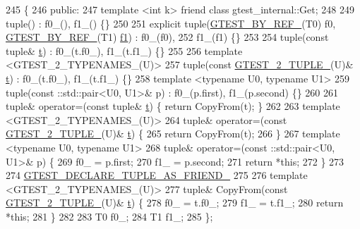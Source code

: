 \begin{DoxyCode}
245                         \{
246  \textcolor{keyword}{public}:
247   \textcolor{keyword}{template} <\textcolor{keywordtype}{int} k> \textcolor{keyword}{friend} \textcolor{keyword}{class }gtest\_internal::Get;
248 
249   tuple() : f0\_(), f1\_() \{\}
250 
251   \textcolor{keyword}{explicit} tuple(\hyperlink{gtest-tuple_8h_adcf9057737a411d833fac0382c13a181}{GTEST\_BY\_REF\_}(T0) f0, \hyperlink{gtest-tuple_8h_adcf9057737a411d833fac0382c13a181}{GTEST\_BY\_REF\_}(T1) 
      \hyperlink{namespacestd_1_1tr1_a9c0fa65b105f8e2f58ba59ecf75fd000}{f1}) : f0\_(f0),
252       f1\_(f1) \{\}
253 
254   tuple(\textcolor{keyword}{const} tuple& \hyperlink{namespacebattery__monitor__node_a7a63d20d1ea461e280f4eb5b47f925cd}{t}) : f0\_(t.f0\_), f1\_(t.f1\_) \{\}
255 
256   \textcolor{keyword}{template} <GTEST\_2\_TYPENAMES\_(U)>
257   tuple(\textcolor{keyword}{const} \hyperlink{gtest-tuple_8h_a93229c3f009273c73eca237b4d19f326}{GTEST\_2\_TUPLE\_}(U)& \hyperlink{namespacebattery__monitor__node_a7a63d20d1ea461e280f4eb5b47f925cd}{t}) : f0\_(t.f0\_), f1\_(t.f1\_) \{\}
258   \textcolor{keyword}{template} <\textcolor{keyword}{typename} U0, \textcolor{keyword}{typename} U1>
259   tuple(const ::std::pair<U0, U1>& p) : f0\_(p.first), f1\_(p.second) \{\}
260 
261   tuple& operator=(\textcolor{keyword}{const} tuple& \hyperlink{namespacebattery__monitor__node_a7a63d20d1ea461e280f4eb5b47f925cd}{t}) \{ \textcolor{keywordflow}{return} CopyFrom(t); \}
262 
263   \textcolor{keyword}{template} <GTEST\_2\_TYPENAMES\_(U)>
264   tuple& operator=(\textcolor{keyword}{const} \hyperlink{gtest-tuple_8h_a93229c3f009273c73eca237b4d19f326}{GTEST\_2\_TUPLE\_}(U)& \hyperlink{namespacebattery__monitor__node_a7a63d20d1ea461e280f4eb5b47f925cd}{t}) \{
265     \textcolor{keywordflow}{return} CopyFrom(t);
266   \}
267   \textcolor{keyword}{template} <\textcolor{keyword}{typename} U0, \textcolor{keyword}{typename} U1>
268   tuple& operator=(const ::std::pair<U0, U1>& p) \{
269     f0\_ = p.first;
270     f1\_ = p.second;
271     \textcolor{keywordflow}{return} *\textcolor{keyword}{this};
272   \}
273 
274   \hyperlink{gtest-tuple_8h_a2b20671273f514a88a6e9b8328e5f257}{GTEST\_DECLARE\_TUPLE\_AS\_FRIEND\_}
275 
276   \textcolor{keyword}{template} <GTEST\_2\_TYPENAMES\_(U)>
277   tuple& CopyFrom(\textcolor{keyword}{const} \hyperlink{gtest-tuple_8h_a93229c3f009273c73eca237b4d19f326}{GTEST\_2\_TUPLE\_}(U)& \hyperlink{namespacebattery__monitor__node_a7a63d20d1ea461e280f4eb5b47f925cd}{t}) \{
278     f0\_ = t.f0\_;
279     f1\_ = t.f1\_;
280     \textcolor{keywordflow}{return} *\textcolor{keyword}{this};
281   \}
282 
283   T0 f0\_;
284   T1 f1\_;
285 \};
\end{DoxyCode}
